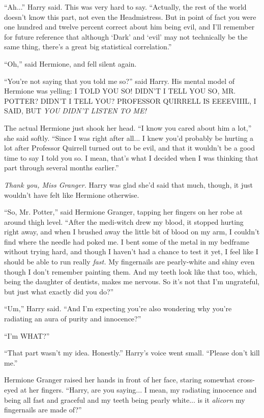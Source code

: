 ``Ah...'' Harry said. This was very hard to say. ``Actually, the rest of the world doesn't know this part, not even the Headmistress. But in point of fact you were one hundred and twelve percent correct about him being evil, and I'll remember for future reference that although `Dark' and `evil' may not technically be the same thing, there's a great big statistical correlation.''

``Oh,'' said Hermione, and fell silent again.

``You're not saying that you told me so?'' said Harry. His mental model of Hermione was yelling: I TOLD YOU SO! DIDN'T I TELL YOU SO, MR. POTTER? DIDN'T I TELL YOU? PROFESSOR QUIRRELL IS EEEEVIIIL, I SAID, BUT \emph{YOU DIDN'T LISTEN TO ME!}

The actual Hermione just shook her head. ``I know you cared about him a lot,'' she said softly. ``Since I was right after all... I knew you'd probably be hurting a lot after Professor Quirrell turned out to be evil, and that it wouldn't be a good time to say I told you so. I mean, that's what I decided when I was thinking that part through several months earlier.''

\emph{Thank you, Miss Granger.} Harry was glad she'd said that much, though, it just wouldn't have felt like Hermione otherwise.

``So, Mr. Potter,'' said Hermione Granger, tapping her fingers on her robe at around thigh level. ``After the medi-witch drew my blood, it stopped hurting right away, and when I brushed away the little bit of blood on my arm, I couldn't find where the needle had poked me. I bent some of the metal in my bedframe without trying hard, and though I haven't had a chance to test it yet, I feel like I should be able to run really \emph{fast.} My fingernails are pearly-white and shiny even though I don't remember painting them. And my teeth look like that too, which, being the daughter of dentists, makes me nervous. So it's not that I'm ungrateful, but just what exactly did you do?''

``Um,'' Harry said. ``And I'm expecting you're also wondering why you're radiating an aura of purity and innocence?''

``I'm WHAT?''

``That part wasn't my idea. Honestly.'' Harry's voice went small. ``Please don't kill me.''

Hermione Granger raised her hands in front of her face, staring somewhat cross-eyed at her fingers. ``Harry, are you saying... I mean, my radiating innocence and being all fast and graceful and my teeth being pearly white... is it \emph{alicorn} my fingernails are made of?''

